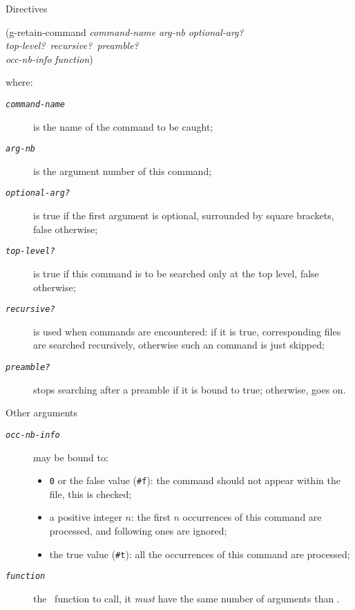 \documentclass[pdf]{beamer}
\begin{document}
\begin{frame}{Directives}
\begin{small}
\begin{ttfamily}
\begin{tabbing}
(g-retain-command \= \textsl{command-name} \textsl{arg-nb} 
\textsl{optional-arg?} \\
 \> \textsl{top-level?}\ \textsl{recursive?}\ \textsl{preamble?} \\
 \> \textsl{occ-nb-info} \textsl{function})  
\end{tabbing}
\end{ttfamily}
where:
\begin{description}
 \item[\textnormal{\texttt{\textsl{command-name}}}] is the name of the command
to be caught;
 \item[\textnormal{\texttt{\textsl{arg-nb}}}] is the argument number of this
command;
 \item[\textnormal{\texttt{\textsl{optional-arg?}}}] is true if the first
argument is optional, surrounded by square brackets, false otherwise;
 \item[\textnormal{\texttt{\textsl{top-level?}}}] is true if this command is to
be searched only at the top level, false otherwise;
 \item[\textnormal{\texttt{\textsl{recursive?}}}] is used when 
commands are encountered: if it is true, corresponding files are searched
recursively, otherwise such an  command is just skipped;
 \item[\textnormal{\texttt{\textsl{preamble?}}}] stops searching after a
preamble if it is bound to true; otherwise, goes on.
\end{description}

\end{small}
\end{frame}

\begin{frame}{Other arguments}
\begin{description}
 \item[\textnormal{\texttt{\textsl{occ-nb-info}}}] may be bound to:
 \begin{itemize}
  \item \texttt{0} or the false value (\texttt{\#f}): the command should not
appear within the file, this is checked;
  \item a positive integer $n$: the first $n$ occurrences of this command are
processed, and following ones are ignored;
  \item the true value (\texttt{\#t}): all the occurrences of this command are
processed;
 \end{itemize}
 \item[\textnormal{\texttt{\textsl{function}}}] the \pgScheme\ function to
call, it \emph{must} have the same number of arguments than
.
\end{description}
\end{frame}
\end{document}
